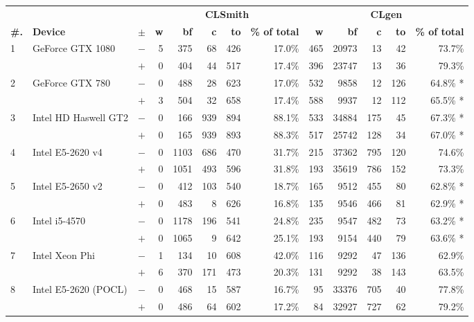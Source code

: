   \begin{tabular}{lll | rrrrr | rrrrr }
  \toprule
  & & & \multicolumn{5}{c|}{\textbf{CLSmith}} & \multicolumn{5}{c}{\textbf{CLgen}} \\
  \textbf{\#.} & \textbf{Device} & $\pm$ &
  \textbf{w} & \textbf{bf} & \textbf{c} & \textbf{to} & \textbf{\% of total} &
  \textbf{w} & \textbf{bf} & \textbf{c} & \textbf{to} & \textbf{\% of total} \\
  \midrule
  \multirow{ 2}{*}{1} & \multirow{ 2}{*}{GeForce GTX 1080} & $-$ & 5 & 375 & 68 & 426 & 17.0\%       & 465 & 20973 & 13 & 42 & 73.7\% \\& & $+$ & 0 & 404 & 44 & 517 & 17.4\% & 396 & 23747 & 13 & 36 & 79.3\% \\
\hline
\multirow{ 2}{*}{2} & \multirow{ 2}{*}{GeForce GTX 780} & $-$ & 0 & 488 & 28 & 623 & 17.0\%       & 532 & 9858 & 12 & 126 & 64.8\% * \\& & $+$ & 3 & 504 & 32 & 658 & 17.4\% & 588 & 9937 & 12 & 112 & 65.5\% * \\
\hline
\multirow{ 2}{*}{3} & \multirow{ 2}{*}{Intel HD Haswell GT2} & $-$ & 0 & 166 & 939 & 894 & 88.1\%       & 533 & 34884 & 175 & 45 & 67.3\% * \\& & $+$ & 0 & 165 & 939 & 893 & 88.3\% & 517 & 25742 & 128 & 34 & 67.0\% * \\
\hline
\multirow{ 2}{*}{4} & \multirow{ 2}{*}{Intel E5-2620 v4} & $-$ & 0 & 1103 & 686 & 470 & 31.7\%       & 215 & 37362 & 795 & 120 & 74.6\% \\& & $+$ & 0 & 1051 & 493 & 596 & 31.8\% & 193 & 35619 & 786 & 152 & 73.3\% \\
\hline
\multirow{ 2}{*}{5} & \multirow{ 2}{*}{Intel E5-2650 v2} & $-$ & 0 & 412 & 103 & 540 & 18.7\%       & 165 & 9512 & 455 & 80 & 62.8\% * \\& & $+$ & 0 & 483 & 8 & 626 & 16.8\% & 135 & 9546 & 466 & 81 & 62.9\% * \\
\hline
\multirow{ 2}{*}{6} & \multirow{ 2}{*}{Intel i5-4570} & $-$ & 0 & 1178 & 196 & 541 & 24.8\%       & 235 & 9547 & 482 & 73 & 63.2\% * \\& & $+$ & 0 & 1065 & 9 & 642 & 25.1\% & 193 & 9154 & 440 & 79 & 63.6\% * \\
\hline
\multirow{ 2}{*}{7} & \multirow{ 2}{*}{Intel Xeon Phi} & $-$ & 1 & 134 & 10 & 608 & 42.0\%       & 116 & 9292 & 47 & 136 & 62.9\% \\& & $+$ & 6 & 370 & 171 & 473 & 20.3\% & 131 & 9292 & 38 & 143 & 63.5\% \\
\hline
\multirow{ 2}{*}{8} & \multirow{ 2}{*}{Intel E5-2620 (POCL)} & $-$ & 0 & 468 & 15 & 587 & 16.7\%       & 95 & 33376 & 705 & 40 & 77.8\% \\& & $+$ & 0 & 486 & 64 & 602 & 17.2\% & 84 & 32927 & 727 & 62 & 79.2\% \\

\end{tabular}
